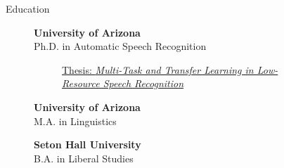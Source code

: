 \documentclass{cv} %
\begin{document}
\newpage
\vspace{.5cm}
\begin{rSection}{Education}

    \begin{figure}[H]
    \begin{minipage}{0.2\textwidth}
      \centering
      
    \end{minipage}
    \begin{minipage}{0.8\textwidth}
      {\bf University of Arizona} \hfill {} \\
      Ph.D. in Automatic Speech Recognition \hfill {\em}
      \vspace{-0.25cm}
   \begin{figure}[H]
    \begin{minipage}{\textwidth}
      
      \footnotesize{\href{http://jrmeyer.github.io/misc/MEYER_dissertation_2019.pdf}{Thesis: \textit{Multi-Task and Transfer Learning in Low-Resource Speech Recognition}} }
      \end{minipage}
  \end{figure}

    \end{minipage}
    \end{figure}
    
  \begin{figure}[H]
    \begin{minipage}{0.2\textwidth}
      \centering
      
    \end{minipage}
    \begin{minipage}{0.8\textwidth}
{\bf University of Arizona} \hfill {} \\
M.A. in Linguistics \hfill {\em}
    \end{minipage}
  \end{figure}
  
  \begin{figure}[H]
    \begin{minipage}{0.2\textwidth}
      \centering
      
    \end{minipage}
    \begin{minipage}{0.8\textwidth}
{\bf Seton Hall University} \hfill {} \\
B.A. in Liberal Studies \hfill {\em}
    \end{minipage}
  \end{figure}


\end{rSection}
\end{document}
